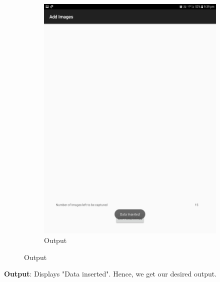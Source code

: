 \documentclass{scrreprt}
\begin{document}
\begin{itemize}
\begin{enumerate}
\begin{figure}[H]
\begin{subfigure}{0.5\textwidth}
\includegraphics[width=0.85\linewidth, keepaspectratio]{added.jpg}
\caption{Output}
\label{fig:subim2}
\end{subfigure}
\end{figure}
\textbf{Output}: Displays "Data inserted". Hence, we get our desired output.


\end{enumerate}
\end{itemize}
\end{document}
